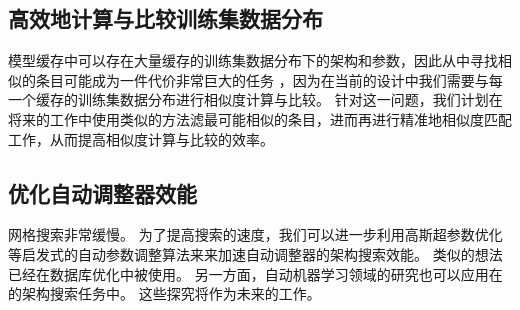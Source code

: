 
\subsection{高效地计算与比较训练集数据分布}
模型缓存中可以存在大量缓存的训练集数据分布下的{\rmi}架构和参数，因此从中寻找相似的条目可能成为一件代价非常巨大的任务
，因为在当前的设计中我们需要与每一个缓存的训练集数据分布进行相似度计算与比较。
针对这一问题，我们计划在将来的工作中使用类似\cite{metwally2005efficient, ilyas2008survey}的方法滤最可能相似的条目，进而再进行精准地相似度匹配工作，从而提高相似度计算与比较的效率。


\subsection{优化自动调整器效能}
网格搜索非常缓慢。
为了提高搜索的速度，我们可以进一步利用高斯超参数优化\cite{snoek2012practical, bergstra2011algorithms, brochu2010tutorial}等启发式的自动参数调整算法来来加速自动调整器的架构搜索效能。
类似的想法已经在数据库优化中被使用\cite{duan2009tuning, thummala2010ituned}。
另一方面，自动机器学习领域的研究也可以应用在{\rmi}的架构搜索任务中。
这些探究将作为未来的工作。

